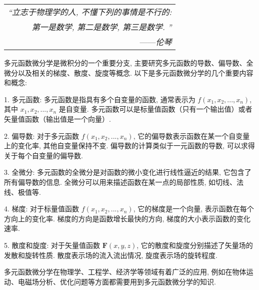 \begin{flushright}
    \begin{tabular}{r|}
        \textit{“立志于物理学的人, 不懂下列的事情是不行的: }\\
        \textit{第一是数学, 第二是数学, 第三是数学. ”}\\
        ——\textit{伦琴}
    \end{tabular}
\end{flushright}

多元函数微分学是微积分的一个重要分支, 主要研究多元函数的导数、偏导数、全微分以及相关的梯度、散度、旋度等概念. 以下是多元函数微分学的几个重要内容和概念: 

1. 多元函数: 多元函数是指具有多个自变量的函数, 通常表示为 $f(x_1, x_2, ..., x_n)$, 其中 $x_1, x_2, ..., x_n$ 是自变量. 多元函数可以是标量值函数（只有一个输出值）或者矢量值函数（输出值是一个向量）. 

2. 偏导数: 对于多元函数 $f(x_1, x_2, ..., x_n)$, 它的偏导数表示函数在某一个自变量上的变化率, 其他自变量保持不变. 偏导数的计算类似于一元函数的导数, 可以求得关于每个自变量的偏导数. 

3. 全微分: 多元函数的全微分是对函数的微小变化进行线性逼近的结果, 它包含了所有偏导数的信息. 全微分可以用来描述函数在某一点的局部性质, 如切线、法线、极值等. 

4. 梯度: 对于标量值函数 $f(x_1, x_2, ..., x_n)$, 它的梯度是一个向量, 表示函数在每个方向上的变化率. 梯度的方向是函数增长最快的方向, 梯度的大小表示函数的变化速率. 

5. 散度和旋度: 对于矢量值函数 $\mathbf{F}(x, y, z)$, 它的散度和旋度分别描述了矢量场的发散和旋转性质. 散度表示场的流入流出情况, 旋度表示场的旋转程度. 

多元函数微分学在物理学、工程学、经济学等领域有着广泛的应用, 例如在物体运动、电磁场分析、优化问题等方面都需要用到多元函数微分学的知识. 
